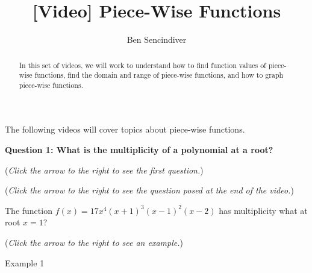 \documentclass{ximera}
\title[Prerequisite Videos: ]{[Video] Piece-Wise Functions}
\author{Ben Sencindiver}
\begin{document}
\begin{abstract}
   In this set of videos, we will work to understand how to find function values of piece-wise functions, find the domain and range of piece-wise functions, and how to graph piece-wise functions.
\end{abstract}
\maketitle

The following videos will cover topics about piece-wise functions.

\textbf{Question 1: What is the multiplicity of a polynomial at a root?}
\begin{question}
\begin{flushright}
{\color{blue}(\emph{Click the arrow to the right to see the first question.})}
\end{flushright}
\begin{center}
\begin{expandable}
\begin{flushright}
{\color{blue}(\emph{Click the arrow to the right to see the question
posed at the end of the video.})}
\end{flushright}
\begin{expandable}
The function $f(x) = 17x^4(x+1)^3(x-1)^2(x-2)$ has multiplicity what at root $x=1$?
\begin{multipleChoice}
\end{multipleChoice}
\begin{flushright}
{\color{blue}(\emph{Click the arrow to the right to see an example.})}
\end{flushright}
\begin{expandable}
Example 1
\end{expandable}
\end{expandable}
\end{expandable}
\end{center}
\end{question}
\end{document}
